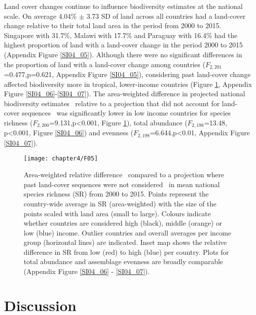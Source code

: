 Land cover changes continue to influence biodiversity estimates at the national scale. On average 4.04\% $\pm$ 3.73 SD of land across all countries had a land-cover change relative to their total land area in the period from 2000 to 2015. Singapore with 31.7\%, Malawi with 17.7\% and Paraguay with 16.4\% had the highest proportion of land with a land-cover change in the period 2000 to 2015 (Appendix Figure \ref{SI04_05}). Although there were no significant differences in the proportion of land with a land-cover change among countries ($F_{2,201}$=0.477,p=0.621, Appendix Figure \ref{SI04_05}), considering past land-cover change affected biodiversity more in tropical, lower-income countries (Figure \ref{F04_05}, Appendix Figure \ref{SI04_06}-\ref{SI04_07}). The area-weighted difference in projected national biodiversity estimates \textendash\ relative to a projection that did not account for land-cover sequences \textendash\ was significantly lower in low income countries for species richness ($F_{2,200}$=9.131,p<0.001, Figure \ref{F04_05}), total abundance ($F_{2,198}$=13.48, p<0.001, Figure \ref{SI04_06}) and evenness ($F_{2,198}$=6.644,p<0.01, Appendix Figure \ref{SI04_07}).

\begin{figure}[hb]
\centering
\texttt{[image: chapter4/F05]}
\caption{ Area-weighted relative difference \textendash\ compared to a projection where past land-cover sequences were not considered \textendash\ in mean national species richness (SR) from 2000 to 2015. Points represent the country-wide average in SR (area-weighted) with the size of the points scaled with land area (small to large). Colours indicate whether countries are considered high (black), middle (orange) or low (blue) income. Outlier countries and overall averages per income group (horizontal lines) are indicated. Inset map shows the relative difference in SR from low (red) to high (blue) per country. Plots for total abundance and assemblage evenness are broadly comparable (Appendix Figure \ref{SI04_06} - \ref{SI04_07}). }
\label{F04_05}
\end{figure}

\section{Discussion}
\label{C04_04}


